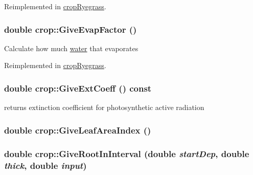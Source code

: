 Reimplemented in \hyperlink{classcrop_ryegrass_aedd4ae77832a94a71902085022f1eb88}{cropRyegrass}.\hypertarget{classcrop_aac8ad06adb13f585cfde7cd3f2661618}{
\subsubsection[{GiveEvapFactor}]{\setlength{\rightskip}{0pt plus 5cm}double crop::GiveEvapFactor ()}}
\label{classcrop_aac8ad06adb13f585cfde7cd3f2661618}
Calculate how much \hyperlink{classwater}{water} that evaporates 

Reimplemented in \hyperlink{classcrop_ryegrass_a8c82f3380064d4351d60aada56820cf4}{cropRyegrass}.\hypertarget{classcrop_aa3ce4d26c1cdce101dfe72adc793ebf2}{
\subsubsection[{GiveExtCoeff}]{\setlength{\rightskip}{0pt plus 5cm}double crop::GiveExtCoeff () const}}
\label{classcrop_aa3ce4d26c1cdce101dfe72adc793ebf2}
returns extinction coefficient for photosynthetic active radiation \hypertarget{classcrop_aa94e2f14b2e8e72c893ab67ad1123e14}{
\subsubsection[{GiveLeafAreaIndex}]{\setlength{\rightskip}{0pt plus 5cm}double crop::GiveLeafAreaIndex ()}}
\label{classcrop_aa94e2f14b2e8e72c893ab67ad1123e14}
\hypertarget{classcrop_a45017219012e2e4865e53c406ca32756}{
\subsubsection[{GiveRootInInterval}]{\setlength{\rightskip}{0pt plus 5cm}double crop::GiveRootInInterval (double {\em startDep}, \/  double {\em thick}, \/  double {\em input})}}
